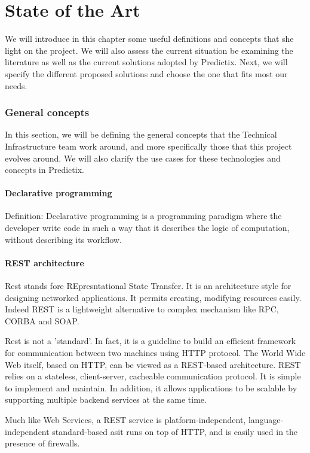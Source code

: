 \chapter{State of the Art}
We will introduce in this chapter some useful definitions and concepts that she
light on  the project. We will also assess the current situation be examining
the literature as well as the current solutions adopted by Predictix. Next, we
will specify the different proposed solutions and choose the one that fits most
our needs.



\subsection{General concepts}

In this section, we will be defining the general concepts that the Technical
Infrastructure team work around, and more specifically those that this project
evolves around. We will also clarify the use cases for these technologies and
concepts in Predictix.

\subsubsection{Declarative programming}
Definition:
Declarative programming is a programming paradigm where the developer write code
in such a way that it describes the logic of computation, without describing its
workflow.

\subsubsection{REST architecture}
Rest stands fore REpresntational State Transfer. It is an architecture style for
designing networked applications. It permits creating, modifying resources
easily. Indeed REST is a lightweight alternative to complex mechanism like RPC,
CORBA and SOAP. 

Rest is not a 'standard'. In fact,  it is a guideline to build an efficient
framework for communication between two machines using HTTP protocol. The World
Wide Web itself, based on HTTP, can be viewed as a REST-based architecture. REST
relies on a stateless, client-server, cacheable communication protocol. It is
simple to implement and maintain. In addition, it allows applications to be scalable
by supporting multiple backend services at the same time.

Much like Web Services, a REST service is platform-independent,
language-independent standard-based asit runs on top of HTTP, and is easily used
in the presence of firewalls.

